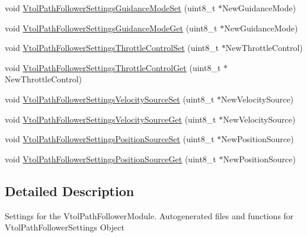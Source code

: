 \begin{DoxyCompactItemize}
\item 
void \hyperlink{group___vtol_path_follower_settings_ga28f4899d4d22f561d5578804109ec8e4}{\-Vtol\-Path\-Follower\-Settings\-Guidance\-Mode\-Set} (uint8\-\_\-t $\ast$\-New\-Guidance\-Mode)
\item 
void \hyperlink{group___vtol_path_follower_settings_gaabc7f6330508141f731859e42b55c8f2}{\-Vtol\-Path\-Follower\-Settings\-Guidance\-Mode\-Get} (uint8\-\_\-t $\ast$\-New\-Guidance\-Mode)
\item 
void \hyperlink{group___vtol_path_follower_settings_gab61ae39139b0a805d44717d9cb487cf8}{\-Vtol\-Path\-Follower\-Settings\-Throttle\-Control\-Set} (uint8\-\_\-t $\ast$\-New\-Throttle\-Control)
\item 
void \hyperlink{group___vtol_path_follower_settings_ga8bc09edf3a80074691f09ccf50695318}{\-Vtol\-Path\-Follower\-Settings\-Throttle\-Control\-Get} (uint8\-\_\-t $\ast$\-New\-Throttle\-Control)
\item 
void \hyperlink{group___vtol_path_follower_settings_gafd9a9f38e6d1a141f6192f3160a9ef59}{\-Vtol\-Path\-Follower\-Settings\-Velocity\-Source\-Set} (uint8\-\_\-t $\ast$\-New\-Velocity\-Source)
\item 
void \hyperlink{group___vtol_path_follower_settings_gae40cc359cc46b4f448837ded82fffb18}{\-Vtol\-Path\-Follower\-Settings\-Velocity\-Source\-Get} (uint8\-\_\-t $\ast$\-New\-Velocity\-Source)
\item 
void \hyperlink{group___vtol_path_follower_settings_gad0101d4b317a57bc8c83471d49fe1dcb}{\-Vtol\-Path\-Follower\-Settings\-Position\-Source\-Set} (uint8\-\_\-t $\ast$\-New\-Position\-Source)
\item 
void \hyperlink{group___vtol_path_follower_settings_ga8e4642883947a9b95dfaee6d950fb065}{\-Vtol\-Path\-Follower\-Settings\-Position\-Source\-Get} (uint8\-\_\-t $\ast$\-New\-Position\-Source)
\end{DoxyCompactItemize}


\subsection{\-Detailed \-Description}
\-Settings for the \-Vtol\-Path\-Follower\-Module. \-Autogenerated files and functions for \-Vtol\-Path\-Follower\-Settings \-Object 


